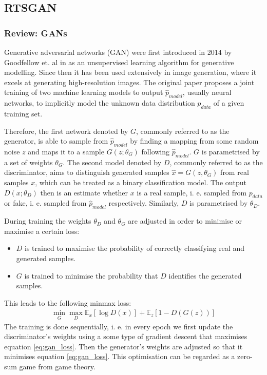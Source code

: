 \subsection{RTSGAN} 

\subsubsection{Review: GANs}
Generative adversarial networks (GAN) were first introduced in 2014 by Goodfellow et. al in \parencite{gan_og} as an unsupervised learning algorithm for generative modelling. Since then it has been used extensively in image generation, where it excels at generating high-resolution images. The original paper proposes a joint training of two machine learning models to output $\hat{p}_{model}$, usually neural networks, to implicitly model the unknown data distribution $p_{data}$ of a given training set. 

Therefore, the first network denoted by $G$, commonly referred to as the generator, is able to sample from $\hat{p}_{model}$ by finding a mapping from some random noise $z$ and maps it to a sample $G(z; \theta_G)$ following $\hat{p}_{model}$. $G$ is parametrised by a set of weights $\theta_G$. The second model denoted by $D$, commonly referred to as the discriminator, aims to distinguish generated samples $\hat{x}= G(z,\theta_G)$ from real samples $x$, which can be treated as a binary classification model. The output $D(x; \theta_D)$ then is an estimate whether $x$ is a real sample, i. e. sampled from $p_{data}$ or fake, i. e. sampled from $\hat{p}_{model}$ respectively. Similarly, $D$ is parametrised by $\theta_D$.

During training the weights $\theta_D$ and $\theta_G$ are adjusted in order to minimise or maximise a certain loss:
\begin{itemize}
    \item $D$ is trained to maximise the probability of correctly classifying real and generated samples.
    \item $G$ is trained to minimise the probability that $D$ identifies the generated samples.
\end{itemize}

This leads to the following minmax loss:
\begin{align} \label{eq:gan_loss}
    \min_G \max_D \mathbb{E}_x[\log D(x)] + \mathbb{E}_z[1-D(G(z))]
\end{align}
The training is done sequentially, i. e. in every epoch we first update the discriminator's weights using a some type of gradient descent that maximises equation \ref{eq:gan_loss}. Then the generator's weights are adjusted so that it minimises equation \ref{eq:gan_loss}. This optimisation can be regarded as a zero-sum game from game theory. 

